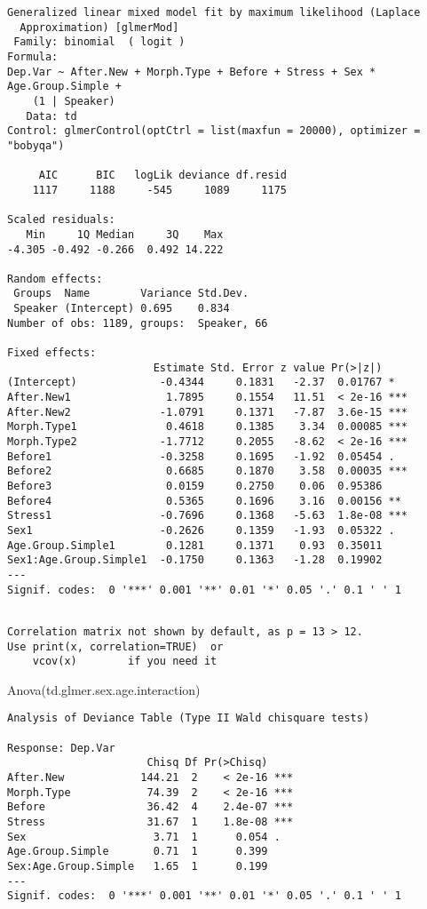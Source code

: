 \documentclass[
  10pt,
  letterpaper]{article}
\newenvironment{Shaded}{\begin{snugshade}}{\end{snugshade}}
\newcommand{\FunctionTok}[1]{\textcolor[rgb]{0.28,0.35,0.67}{#1}}
\newcommand{\NormalTok}[1]{\textcolor[rgb]{0.00,0.23,0.31}{#1}}
\begin{document}
\begin{verbatim}
Generalized linear mixed model fit by maximum likelihood (Laplace
  Approximation) [glmerMod]
 Family: binomial  ( logit )
Formula: 
Dep.Var ~ After.New + Morph.Type + Before + Stress + Sex * Age.Group.Simple +  
    (1 | Speaker)
   Data: td
Control: glmerControl(optCtrl = list(maxfun = 20000), optimizer = "bobyqa")

     AIC      BIC   logLik deviance df.resid 
    1117     1188     -545     1089     1175 

Scaled residuals: 
   Min     1Q Median     3Q    Max 
-4.305 -0.492 -0.266  0.492 14.222 

Random effects:
 Groups  Name        Variance Std.Dev.
 Speaker (Intercept) 0.695    0.834   
Number of obs: 1189, groups:  Speaker, 66

Fixed effects:
                       Estimate Std. Error z value Pr(>|z|)    
(Intercept)             -0.4344     0.1831   -2.37  0.01767 *  
After.New1               1.7895     0.1554   11.51  < 2e-16 ***
After.New2              -1.0791     0.1371   -7.87  3.6e-15 ***
Morph.Type1              0.4618     0.1385    3.34  0.00085 ***
Morph.Type2             -1.7712     0.2055   -8.62  < 2e-16 ***
Before1                 -0.3258     0.1695   -1.92  0.05454 .  
Before2                  0.6685     0.1870    3.58  0.00035 ***
Before3                  0.0159     0.2750    0.06  0.95386    
Before4                  0.5365     0.1696    3.16  0.00156 ** 
Stress1                 -0.7696     0.1368   -5.63  1.8e-08 ***
Sex1                    -0.2626     0.1359   -1.93  0.05322 .  
Age.Group.Simple1        0.1281     0.1371    0.93  0.35011    
Sex1:Age.Group.Simple1  -0.1750     0.1363   -1.28  0.19902    
---
Signif. codes:  0 '***' 0.001 '**' 0.01 '*' 0.05 '.' 0.1 ' ' 1
\end{verbatim}

\begin{verbatim}

Correlation matrix not shown by default, as p = 13 > 12.
Use print(x, correlation=TRUE)  or
    vcov(x)        if you need it
\end{verbatim}

\begin{Shaded}
\begin{Highlighting}[]
\FunctionTok{Anova}\NormalTok{(td.glmer.sex.age.interaction)}
\end{Highlighting}
\end{Shaded}

\begin{verbatim}
Analysis of Deviance Table (Type II Wald chisquare tests)

Response: Dep.Var
                      Chisq Df Pr(>Chisq)    
After.New            144.21  2    < 2e-16 ***
Morph.Type            74.39  2    < 2e-16 ***
Before                36.42  4    2.4e-07 ***
Stress                31.67  1    1.8e-08 ***
Sex                    3.71  1      0.054 .  
Age.Group.Simple       0.71  1      0.399    
Sex:Age.Group.Simple   1.65  1      0.199    
---
Signif. codes:  0 '***' 0.001 '**' 0.01 '*' 0.05 '.' 0.1 ' ' 1
\end{verbatim}
\end{document}
